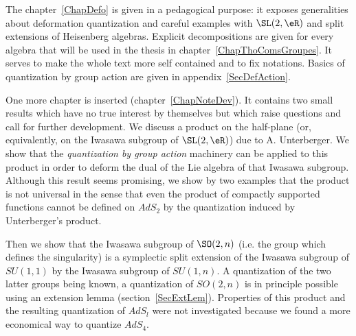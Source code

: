 The chapter~\ref{ChapDefo} is given in a pedagogical purpose: it exposes generalities about deformation quantization and careful examples with $\SL(2,\eR)$ and split extensions of Heisenberg algebras. Explicit decompositions are given for every algebra that will be used in the thesis in chapter~\ref{ChapThoComsGroupes}. It serves to make the whole text more self contained and to fix notations. Basics of quantization by group action are given in appendix~\ref{SecDefAction}.

One more chapter is inserted (chapter~\ref{ChapNoteDev}). It contains two small results which have no true interest by themselves but which raise questions and call for further development. We discuss a product on the half-plane (or, equivalently, on the Iwasawa subgroup of $\SL(2,\eR)$) due to A. Unterberger. We show that the \emph{quantization by group action} machinery can be applied to this product in order to deform the dual of the Lie algebra of that Iwasawa subgroup. Although this result seems promising, we show by two examples that the product is not universal in the sense that even the product of compactly supported functions cannot be defined on $AdS_2$ by the quantization induced by Unterberger's product.

 Then we show that the Iwasawa subgroup of $\SO(2,n)$ (i.e. the group which defines the singularity) is a symplectic split extension of the Iwasawa subgroup of $SU(1,1)$ by the Iwasawa subgroup of $SU(1,n)$. A quantization of the two latter groups being known, a quantization of $SO(2,n)$ is in principle possible using an extension lemma (section~\ref{SecExtLem}). Properties of this product and the resulting quantization of $AdS_l$ were not investigated because we found a more economical way to quantize $AdS_4$.
